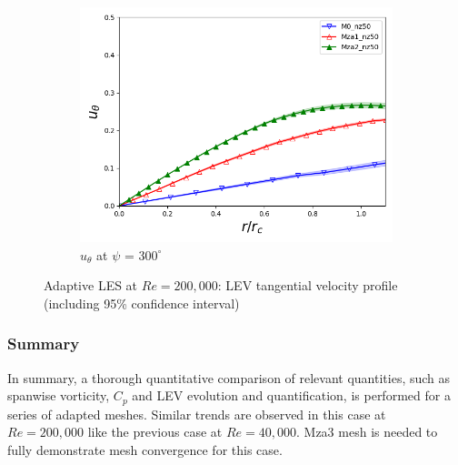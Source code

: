 \begin{figure}[H]
	\begin{subfigure}[b]{0.475\textwidth}
		\centering
		\includegraphics[width=1\textwidth]{figures/zonal_adapt_results/LEV_Re200k/u_theta/phase_300.png}
		\caption{ $u_\theta$ at $\psi$ = $300^\circ$}
		\label{fig:zonal_utheta_300_Re200k}
	\end{subfigure}
	\caption{Adaptive LES at $Re = 200,000$: LEV tangential velocity profile (including 95\% confidence interval)}
	\label{fig:zonal_utheta_LEV_Re200k}
\end{figure}

\subsubsection{Summary}
In summary, a thorough quantitative comparison of relevant quantities, such as spanwise vorticity, $C_p$ and LEV evolution and quantification, is performed for a series of adapted meshes. Similar trends are observed in this case at $Re=200,000$ like the previous case at $Re=40,000$. Mza3 mesh is needed to fully demonstrate mesh convergence for this case.
